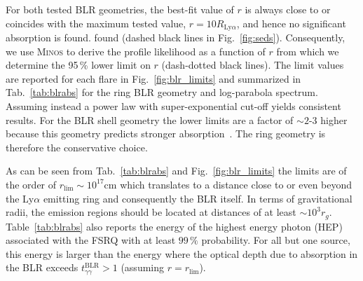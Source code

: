 \documentclass[twocolumn,linenumbers]{aastex62}
\begin{document}
For both tested BLR geometries, the best-fit value of $r$ is always close to or coincides with the maximum tested value, $r = 10R_{\mathrm{Ly}\alpha}$, and hence no significant absorption is found. found (dashed black lines in Fig.~\ref{fig:seds}). Consequently,  we use \textsc{Minos} to derive the profile likelihood as a function of $r$ from which we determine the 95\,\% lower limit on $r$ (dash-dotted black lines). 
The limit values are reported for each flare in Fig.~\ref{fig:blr_limits} and  summarized in Tab.~\ref{tab:blrabs} for the ring BLR geometry and log-parabola spectrum.
Assuming instead a power law with super-exponential cut-off yields consistent results. 
For the BLR shell geometry the lower limits are a factor of $\sim2$-$3$ higher because this geometry predicts stronger absorption~\citep{finke2016}. The ring geometry is therefore the conservative choice. 

As can be seen from Tab.~\ref{tab:blrabs} and Fig.~\ref{fig:blr_limits} the limits are of the order of $r_\mathrm{lim}\sim10^{17}$cm which translates to a distance close to or even beyond the Ly$\alpha$ emitting ring and consequently the BLR itself. In terms of gravitational radii, the emission regions should be located at distances of at least $\sim10^3r_g$. 
Table~\ref{tab:blrabs} also reports the energy of the highest energy photon (HEP) associated with the FSRQ with at least $99\,\%$ probability. For all but one source, this energy is larger than the energy where the optical depth due to absorption in the BLR exceeds $t_{\gamma\gamma}^\mathrm{BLR} > 1$ (assuming $r = r_\mathrm{lim}$). 
\end{document}
